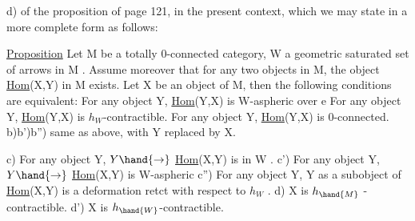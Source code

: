 
d) of the proposition of page 121, in the present context, which we may
state in a more complete form as follows:

\uline{Proposition} Let M be a totally  0-connected category, W a geometric
saturated set of arrows in M . Assume moreover that for any two objects
in M, the object \uline{Hom}(X,Y) in M exists. Let X be an object of M, then
the following conditions  are equivalent:
 For any object Y, \uline{Hom}(Y,X) is W-aspheric over e 
 For any object Y, \uline{Hom}(Y,X) is $h_W$-contractible.
 For any object Y, \uline{Hom}(Y,X) is 0-connected.
b)b')b'') same as above, with Y replaced by X.

c) For any object Y, $Y\hand{\rightarrow}$ \uline{Hom}(X,Y) is in W .
c') For any object Y, $Y\hand{\rightarrow}$ \uline{Hom}(X,Y) is W-aspheric
c'') For any object Y, Y as a subobject of \uline{Hom}(X,Y) is a deformation
retct with respect to $h_W$ .
d) X is $h_{\hand{M}}$ - contractible.
d') X is $h_{\hand{W}}$-contractible.

